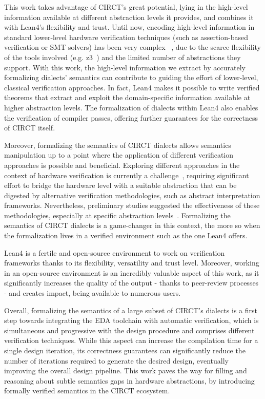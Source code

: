 \documentclass[sigconf,authorversion,nonacm, 11pt]{acmart}
\begin{document}
This work takes advantage of CIRCT's great potential, lying in the high-level information available at different abstraction levels it provides, 
and combines it with Lean4's flexibility and trust. 
Until now, encoding high-level information in standard lower-level hardware verification techniques 
(such as assertion-based verification or SMT solvers) has been very complex ~\cite{symbiyosys, witharana2022survey}, 
due to the scarce flexibility of the tools involved (e.g. z3~\cite{de2008z3}) and the limited number of abstractions they support. 
With this work, the high-level information we extract by accurately formalizing dialects' semantics can contribute to guiding the effort of lower-level, 
classical verification approaches.   
In fact, Lean4 makes it possible to write verified theorems that extract and exploit the domain-specific information 
available at higher abstraction levels. 
The formalization of dialects within Lean4 also enables the verification of compiler passes, offering further guarantees for the correctness
of CIRCT itself. 

Moreover, formalizing the semantics of CIRCT dialects allows semantics manipulation up to a point where the application of different verification approaches is possible and beneficial. 
Exploring different approaches in the context of hardware verification is currently a challenge~\cite{mukherjee2015hardware, malik2008hardware}, requiring significant effort to bridge the hardware level 
with a suitable abstraction that can be digested by alternative verification methodologies, such as abstract interpretation frameworks. 
Nevertheless, preliminary studies suggested the effectiveness of these methodologies, 
especially at specific abstraction levels~\cite{bernstein2021semantics}. 
Formalizing the semantics of CIRCT dialects is a game-changer in this context, the more so when the formalization 
lives in a verified environment such as the one Lean4 offers. 



Lean4 is a fertile and open-source environment to work on verification frameworks thanks to its flexibility, versatility and trust level. 
Moreover, working in an open-source environment is an incredibly valuable aspect of this work, as it significantly increases the quality of the output - thanks to peer-review processes - 
and creates impact, being available to numerous users.  

Overall, formalizing the semantics of a large subset of CIRCT's dialects is a first step towards integrating the EDA toolchain with automatic verification, 
which is simultaneous and progressive with the design procedure and comprises different verification techniques. 
While this aspect can increase the compilation time for a single design iteration, 
its correctness guarantees can significantly reduce the number of iterations required to generate the desired design, 
eventually improving the overall design pipeline.
This work paves the way for filling and reasoning about subtle semantics gaps in hardware abstractions, by introducing formally verified semantics 
in the CIRCT ecosystem.
\end{document}
